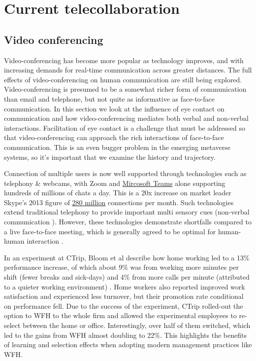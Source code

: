 
\section{Current telecollaboration}
\subsection{Video conferencing}
Video-conferencing has become more popular as technology improves, and with increasing demands for real-time communication across greater distances. The full effects of video-conferencing on human communication are still being explored. Video-conferencing is presumed to be a somewhat richer form of communication than email and telephone, but not quite as informative as face-to-face communication. In this section we look at the influence of eye contact on communication and how video-conferencing mediates both verbal and non-verbal interactions. Facilitation of eye contact is a challenge that must be addressed so that video-conferencing can approach the rich interactions of face-to-face communication. This is an even bugger problem in the emerging metaverse systems, so it's important that we examine the history and trajectory.\par
Connection of multiple users is now well supported through technologies such as telephony \& webcams, with Zoom and \href{https://www.microsoft.com/en-us/Investor/earnings/FY-2021-Q1/press-release-webcast}{Mircosoft Teams} alone supporting hundreds of millions of chats a day. This is a 20x increase on market leader Skype's 2013 figure of \href{https://www.microsoft.com/en-us/Investor/earnings/FY-2013-Q1/press-release-webcast}{280 million} connections per month. Such technologies extend traditional telephony to provide important multi sensory cues (non-verbal communication \cite{Argyle1976, Wolff2008}).  However, these technologies demonstrate shortfalls compared to a live face-to-face meeting, which is generally agreed to be optimal for human-human interaction \cite{Wolff2008}.\par
In an experiment at CTrip, Bloom et al describe how home working led to a 13\% performance increase, of which about 9\% was from working more minutes per shift (fewer breaks and sick-days) and 4\% from more calls per minute (attributed to a quieter working environment) \cite{Bloom2015}. Home workers also reported improved work satisfaction and experienced less turnover, but their promotion rate conditional on performance fell. Due to the success of the experiment, CTrip rolled-out the option to WFH to the whole firm and allowed the experimental employees to re-select between the home or office. Interestingly, over half of them switched, which led to the gains from WFH almost doubling to 22\%. This highlights the benefits of learning and selection effects when adopting modern management practices like WFH.\par

